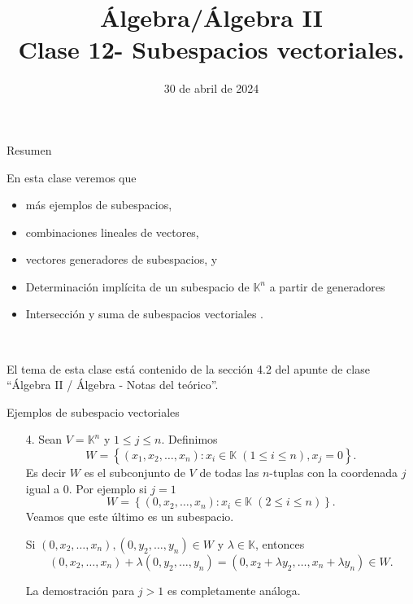 \documentclass[handout]{beamer} %
\title[Clase 12 - Subespacios vectoriales]{Álgebra/Álgebra II \\ Clase 12- Subespacios vectoriales.}
\author[]{}
\institute[]{\normalsize FAMAF / UNC
	\\[\baselineskip] ${}^{}$
	\\[\baselineskip]
}
\date[30/04/2024]{30 de abril de 2024}
\newcommand{\K}{\mathbb K}
\begin{document}
\begin{frame}
\maketitle
\end{frame}


\begin{frame}{Resumen}

    En esta clase veremos que
    \begin{itemize}
    \item más ejemplos de subespacios, 
        \item combinaciones lineales de vectores,
        \item vectores generadores de subespacios,  y
        \item Determinación implícita de un subespacio de $\mathbb{K}^n$ a
        partir de generadores
        \item Intersección y suma de subespacios vectoriales . 
    \end{itemize}
    

\

El tema de esta clase  está contenido de la sección 4.2 del apunte de clase ``Álgebra II / Álgebra - Notas del teórico''.
\end{frame}


    \begin{frame}{Ejemplos de subespacio vectoriales}
    
    
        \begin{enumerate}     
            \item[4.] Sean $V=\K^n$ y $1\le j \le n$. Definimos 
            $$
            W = \left\{ (x_1,x_2,\ldots,x_n): x_i \in \K\; (1 \le i \le n), x_j =0\right\}.
            $$
            Es decir $W$  es el subconjunto de $V$ de todas las $n$-tuplas con la coordenada $j$ igual a 0. Por ejemplo  si $j=1$ 
            $$
            W = \left\{ (0,x_2,\ldots,x_n): x_i \in \K \;(2 \le i \le n)\right\}.
            $$
            \pause
            Veamos que este último es un subespacio.
            
            Si $(0,x_2,\ldots,x_n), (0,y_2,\ldots,y_n) \in W$ y  $\lambda \in \K$,  entonces
            $$(0,x_2,\ldots,x_n)+ \lambda(0,y_2,\ldots,y_n) = (0,x_2+\lambda y_2,\ldots,x_n+\lambda y_n) \in W.$$
            
            
            La demostración para $j >1$ es completamente análoga. 
        \end{enumerate}

    
    \end{frame}
    
\end{document}
